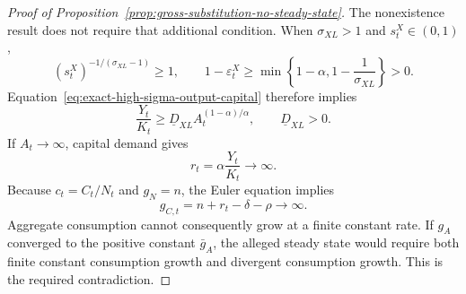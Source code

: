 \begin{proof}[Proof of Proposition~\ref{prop:gross-substitution-no-steady-state}]
The nonexistence result does not require that additional condition. When
$\sigma_{XL}>1$ and $s^X_t\in(0,1)$,
\[
    (s^X_t)^{-1/(\sigma_{XL}-1)}\geq1,
    \qquad
    1-\varepsilon^X_t
    \geq
    \min\left\{1-\alpha,1-\frac{1}{\sigma_{XL}}\right\}>0.
\]
Equation~\eqref{eq:exact-high-sigma-output-capital} therefore implies
\begin{equation}
    \frac{Y_t}{K_t}
    \geq
    \underline D_{XL}A_t^{(1-\alpha)/\alpha},
    \qquad
    \underline D_{XL}>0.
    \label{eq:high-sigma-output-capital-lower-bound}
\end{equation}
If $A_t\to\infty$, capital demand gives
\begin{equation}
    r_t
    =\alpha\frac{Y_t}{K_t}
    \longrightarrow\infty.
    \label{eq:high-sigma-return-divergence}
\end{equation}
Because $c_t=C_t/N_t$ and $g_N=n$, the Euler equation implies
\begin{equation}
    g_{C,t}
    =n+r_t-\delta-\rho
    \longrightarrow\infty.
    \label{eq:high-sigma-consumption-growth-divergence}
\end{equation}
Aggregate consumption cannot consequently grow at a finite constant rate. If $g_A$
converged to the positive constant $\bar g_A$, the alleged steady state would require
both finite constant consumption growth and divergent consumption growth. This is the
required contradiction.
\end{proof}

